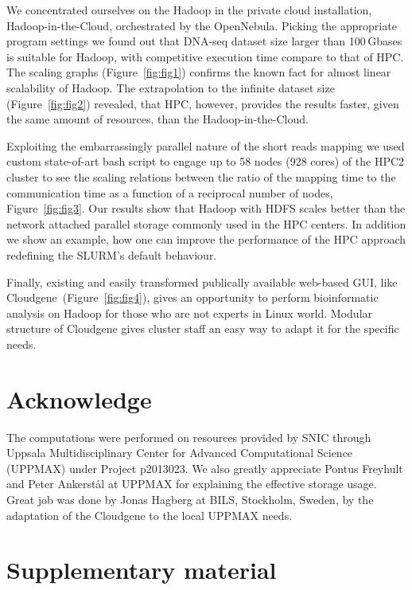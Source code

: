 \documentclass[11pt, oneside]{article}   	%
\begin{document}
We concentrated ourselves on the Hadoop  in the private cloud installation, Hadoop-in-the-Cloud, orchestrated by the OpenNebula. 
Picking the appropriate program settings we found out that DNA-seq dataset size larger than 100\,Gbases is suitable for Hadoop, with competitive  execution time compare to  that of HPC.
The scaling graphs (Figure~\ref{fig:fig1}) confirms the known fact for almost linear scalability of Hadoop.
The extrapolation to the infinite dataset size (Figure~\ref{fig:fig2}) revealed, that HPC, however, provides the results faster, given the same amount of resources, than the Hadoop-in-the-Cloud. 

Exploiting  the embarrassingly parallel nature of the short reads mapping we used custom state-of-art bash script to engage up to 58 nodes (928 cores) of the HPC2 cluster to  see the scaling relations between the ratio of the mapping time to the communication time as a function of a reciprocal number of nodes, Figure~\ref{fig:fig3}. 
Our results show that Hadoop with HDFS scales better than the network attached parallel storage commonly used in the HPC centers.
In addition we show  an example, how one can improve the performance of the HPC approach redefining the SLURM's default behaviour.


Finally, existing and easily transformed publically available web-based GUI, like Cloudgene~(Figure~\ref{fig:fig4}),  gives an opportunity to perform bioinformatic analysis on Hadoop for those who are not experts in Linux world.  Modular structure of Cloudgene gives cluster staff an easy way to adapt it for the specific needs.



\section{Acknowledge}
The computations were performed on resources provided by SNIC through Uppsala Multidisciplinary Center for Advanced Computational Science (UPPMAX) under Project p2013023.
We also greatly appreciate   Pontus Freyhult and Peter Ankerst{\aa}l at  UPPMAX for explaining the effective storage usage. Great job was done by Jonas Hagberg at BILS, Stockholm, Sweden, by the adaptation of the Cloudgene to the local UPPMAX needs.



\section{Supplementary material}
\end{document}
